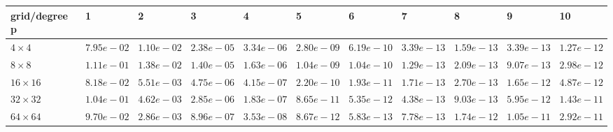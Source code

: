 \begin{tabular}{lllllllllll}
\hline
 grid/degree p   & 1          & 2          & 3          & 4          & 5          & 6          & 7          & 8          & 9          & 10         \\
\hline
 $4 \times 4$    & $7.95e-02$ & $1.10e-02$ & $2.38e-05$ & $3.34e-06$ & $2.80e-09$ & $6.19e-10$ & $3.39e-13$ & $1.59e-13$ & $3.39e-13$ & $1.27e-12$ \\
 $8 \times 8$    & $1.11e-01$ & $1.38e-02$ & $1.40e-05$ & $1.63e-06$ & $1.04e-09$ & $1.04e-10$ & $1.29e-13$ & $2.09e-13$ & $9.07e-13$ & $2.98e-12$ \\
 $16 \times 16$  & $8.18e-02$ & $5.51e-03$ & $4.75e-06$ & $4.15e-07$ & $2.20e-10$ & $1.93e-11$ & $1.71e-13$ & $2.70e-13$ & $1.65e-12$ & $4.87e-12$ \\
 $32 \times 32$  & $1.04e-01$ & $4.62e-03$ & $2.85e-06$ & $1.83e-07$ & $8.65e-11$ & $5.35e-12$ & $4.38e-13$ & $9.03e-13$ & $5.95e-12$ & $1.43e-11$ \\
 $64 \times 64$  & $9.70e-02$ & $2.86e-03$ & $8.96e-07$ & $3.53e-08$ & $8.67e-12$ & $5.83e-13$ & $7.78e-13$ & $1.74e-12$ & $1.05e-11$ & $2.92e-11$ \\
\hline
\end{tabular}